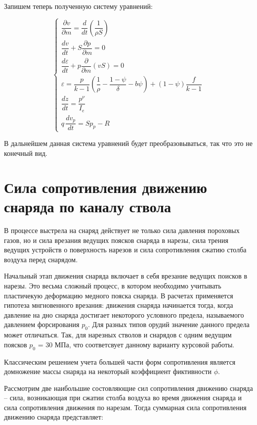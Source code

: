 \documentclass[14pt, a4paper]{extreport} %
\begin{document}
Запишем теперь полученную систему уравнений: 

\[
\left\{
\begin{array}{l}
\dfrac{\partial v}{\partial m} = \dfrac{d}{dt}\left(\dfrac{1}{\rho S}\right) \\[1.5ex]
\dfrac{dv}{dt} + S\dfrac{\partial p}{\partial m} = 0 \\[1.5ex]
\dfrac{d\varepsilon}{dt} + p\dfrac{\partial}{\partial m}(vS) = 0 \\[1.5ex]
\varepsilon = \dfrac{p}{k - 1} \left( \dfrac{1}{\rho} - \dfrac{1 - \psi}{\delta} - b \psi \right) + (1 - \psi) \dfrac{f}{k - 1} \\[1.5ex]
\dfrac{dz}{dt} = \dfrac{p^\nu}{I_e} \\[1.5ex]
q \, \dfrac{d v_{p}}{d t} = S p_{p} - R
\end{array}
\right.
\]

В дальнейшем данная система уравнений будет преобразовываться, так что это не конечный вид.

\section{Сила сопротивления движению снаряда по каналу ствола}

В процессе выстрела на снаряд действует не только сила давления пороховых газов, но и сила врезания ведущих поясков снаряда в нарезы, сила трения ведущих устройств о поверхность нарезов и сила сопротивления сжатию столба воздуха перед снарядом. 

Начальный этап движения снаряда включает в себя врезание ведущих поисков в нарезы. Это весьма сложный процесс, в котором необходимо учитывать пластичекую деформацию медного пояска снаряда. В расчетах применяется гипотеза мнгновенного врезания: движения снаряда начинается тогда, когда давление на дно снаряда достигает 
некоторого условного предела, называемого давлением форсирования $p_0$. Для разных типов орудий значение данного предела может отличаться. Так, для нарезных стволов и снарядов с одним ведущим поясков $p_0$ = 30 МПа, что соответсвует данному варианту курсовой работы.

Классическим решением учета большей части форм сопротивления является домножение массы снаряда на некоторый коэффициент фиктивности $\phi$.

Рассмотрим две наибольшие состовляющие сил сопротивления движению снаряда -- сила, возникающая при сжатии столба воздуха во время движения снаряда и сила сопротивления движения по нарезам. Тогда суммарная сила сопротивления
движению снаряда представляет: 
\end{document}
